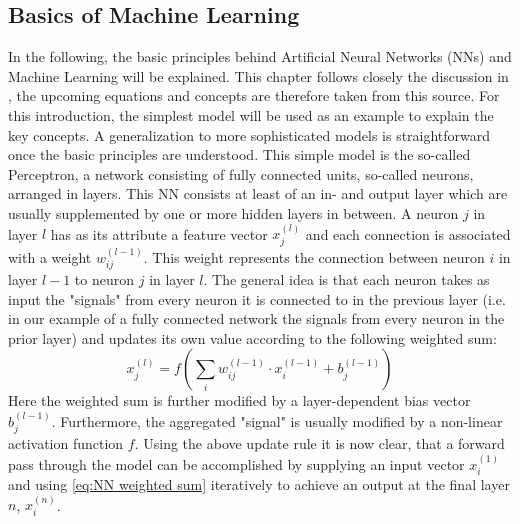 \documentclass[11pt,a4paper]{article}
\begin{document}
\subsection{Basics of Machine Learning}
\label{ssec:BAsics of Machine Learning}
In the following, the basic principles behind Artificial Neural Networks (NNs) and Machine Learning will be explained. 
This chapter follows closely the discussion in \cite{kubatChapter5Artificial2017}, the upcoming equations and concepts are therefore taken from this source. 
For this introduction, the simplest model will be used as an example to explain the key concepts. 
A generalization to more sophisticated models is straightforward once the basic principles are understood. 
This simple model is the so-called Perceptron, a network consisting of fully connected units, so-called neurons, arranged in layers. 
This NN consists at least of an in- and output layer which are usually supplemented by one or more hidden layers in between. 
A neuron $j$ in layer $l$ has as its attribute a feature vector $x^{(l)}_j$ and each connection is associated with a weight $w_{ij}^{(l-1)}$. 
This weight represents the connection between neuron $i$ in layer $l-1$ to neuron $j$ in layer $l$. 
The general idea is that each neuron takes as input the "signals" from every neuron it is connected to in the previous layer (i.e. in our example of a fully connected network the signals from every neuron in the prior layer) and updates its own value according to the following weighted sum:
\begin{equation}
\label{eq:NN weighted sum}
x^{(l)}_j = f\left(\sum_i w_{ij}^{(l-1)} \cdot x^{(l-1)}_i + b_j^{(l-1)}\right)
\end{equation}
Here the weighted sum is further modified by a layer-dependent bias vector $ b_j^{(l-1)}$. 
Furthermore, the aggregated "signal" is usually modified by a non-linear activation function $f$. 
Using the above update rule it is now clear, that a forward pass through the model can be accomplished by supplying an input vector $x^{(1)}_i$ and using \autoref{eq:NN weighted sum} iteratively to achieve an output at the final layer $n$, $x^{(n)}_i$. \\
\end{document}
